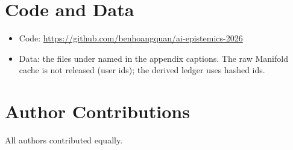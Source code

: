 \documentclass[10pt]{article}
\begin{document}
\section*{Code and Data}
\begin{itemize}\setlength{\itemsep}{1pt}\setlength{\parskip}{0pt}
\item Code: \url{https://github.com/benhoangquan/ai-epistemics-2026}
\item Data: the files under  named in the appendix captions. The raw Manifold cache is not released (user ids); the derived ledger uses hashed ids.
\end{itemize}

\section*{Author Contributions}
All authors contributed equally.
\label{endbody}
\end{document}
